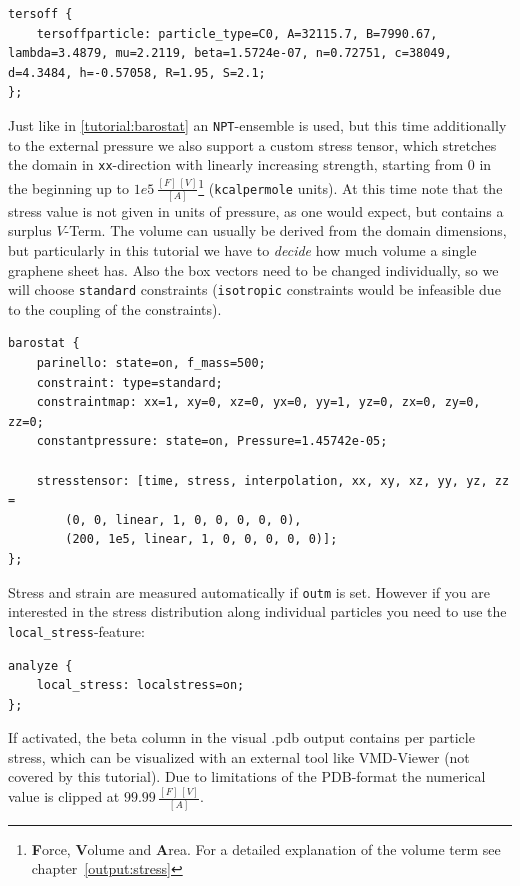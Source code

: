 \begin{lstlisting}
tersoff {
    tersoffparticle: particle_type=C0, A=32115.7, B=7990.67, lambda=3.4879, mu=2.2119, beta=1.5724e-07, n=0.72751, c=38049, d=4.3484, h=-0.57058, R=1.95, S=2.1;
};
\end{lstlisting}

Just like in \ref{tutorial:barostat} an \texttt{NPT}-ensemble is used, but this time
additionally to the external pressure we also support a custom stress tensor,
which stretches the domain in \texttt{xx}-direction with linearly increasing
strength, starting from $0$ in the beginning up to $1e5\,\frac{[F]\,[V]}{[A]}$\footnote{\textbf{F}orce, \textbf{V}olume and \textbf{A}rea.
For a detailed explanation of the volume term see chapter~\ref{output:stress}}
(\texttt{kcalpermole} units). At this time note that the stress value is not
given in units of pressure, as one would expect, but contains a surplus
$V$-Term.  The volume can usually be derived from the domain dimensions, but
particularly in this tutorial we have to \emph{decide} how much volume a single
graphene sheet has. Also the box vectors need to be changed individually, so we
will choose \texttt{standard} constraints (\texttt{isotropic} constraints would be
infeasible due to the coupling of the constraints).

\begin{lstlisting}
barostat {
    parinello: state=on, f_mass=500;
    constraint: type=standard;
    constraintmap: xx=1, xy=0, xz=0, yx=0, yy=1, yz=0, zx=0, zy=0, zz=0;
    constantpressure: state=on, Pressure=1.45742e-05;

    stresstensor: [time, stress, interpolation, xx, xy, xz, yy, yz, zz =
        (0, 0, linear, 1, 0, 0, 0, 0, 0),
        (200, 1e5, linear, 1, 0, 0, 0, 0, 0)];
};
\end{lstlisting}

Stress and strain are measured automatically if \texttt{outm} is set. However
if you are interested in the stress distribution along individual particles you
need to use the \texttt{local\_stress}-feature:

\begin{lstlisting}
analyze {
    local_stress: localstress=on;
};
\end{lstlisting}

If activated, the beta column in the visual .pdb output contains per particle
stress, which can be visualized with an external tool like VMD-Viewer (not
covered by this tutorial). Due to limitations of the PDB-format the numerical
value is clipped at $99.99\,\frac{[F]\,[V]}{[A]}$. 


